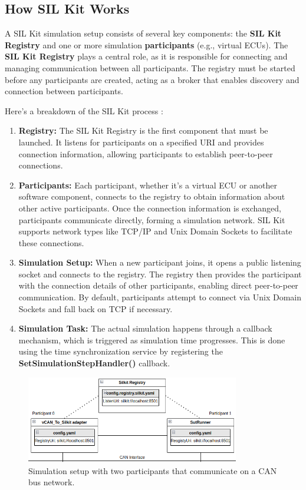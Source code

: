 \subsection{How SIL Kit Works}
A SIL Kit simulation setup consists of several key components: the \textbf{SIL Kit Registry} and one or more simulation \textbf{participants} (e.g., virtual ECUs). The \textbf{SIL Kit Registry} plays a central role, as it is responsible for connecting and managing communication between all participants. The registry must be started before any participants are created, acting as a broker that enables discovery and connection between participants.

Here’s a breakdown of the SIL Kit process \cite{sil_kit_docs}:

\begin{enumerate}
\item \textbf{Registry: } The SIL Kit Registry is the first component that must be launched. It listens for participants on a specified URI and provides connection information, allowing participants to establish peer-to-peer connections.
\item \textbf{Participants: } Each participant, whether it's a virtual ECU or another software component, connects to the registry to obtain information about other active participants. Once the connection information is exchanged, participants communicate directly, forming a simulation network. SIL Kit supports network types like TCP/IP and Unix Domain Sockets to facilitate these connections.
\item \textbf{Simulation Setup: } When a new participant joins, it opens a public listening socket and connects to the registry. The registry then provides the participant with the connection details of other participants, enabling direct peer-to-peer communication. By default, participants attempt to connect via Unix Domain Sockets and fall back on TCP if necessary.
\item \textbf{Simulation Task: } The actual simulation happens through a callback mechanism, which is triggered as simulation time progresses. This is done using the time synchronization service by registering the \textbf{SetSimulationStepHandler()} callback. 
\end{enumerate}

\begin{figure}[htpb]
  \centering
  \includegraphics[width=0.83\textwidth]{figures/silkit_connection.PNG}
  \caption{ Simulation setup with two participants that communicate on a CAN bus network.} \label{fig:silkit_conn}
\end{figure}

